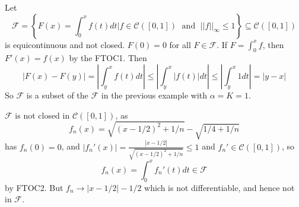 \begin{example}
    Let $$\mathcal{F} = \left\{F(x) = \int_0^xf(t)dt\vert f \in \mathcal{C}([0,1])\;\text{ and }\;||f||_{\infty} \leq 1\right\} \subseteq \mathcal{C}([0,1])$$ is equicontinuous and not closed. $F(0) = 0$ for all $F \in \mathcal{F}$. If $F = \int_0^xf$, then $F'(x) = f(x)$ by the FTOC1. Then $$|F(x) - F(y)| = \left|\int_y^xf(t)dt\right| \leq \left|\int_y^x|f(t)|dt\right| \leq \left|\int_y^x1dt\right| = |y-x|$$ So $\mathcal{F}$ is a subset of the $\mathcal{F}$ in the previous example with $\alpha = K = 1$.

    $\mathcal{F}$ is not closed in $\mathcal{C}([0,1])$, as $$f_n(x) = \sqrt{(x-1/2)^2+1/n} - \sqrt{1/4+1/n}$$ has $f_n(0) = 0$, and $|f_n'(x)| = \frac{|x-1/2|}{\sqrt{(x-1/2)^2+1/n}} \leq 1$ and $f_n' \in \mathcal{C}([0,1])$, so $$f_n(x) = \int_0^xf_n'(t)dt \in \mathcal{F}$$ by FTOC2. But $f_n \rightarrow |x-1/2| - 1/2$ which is not differentiable, and hence not in $\mathcal{F}$.
\end{example}

